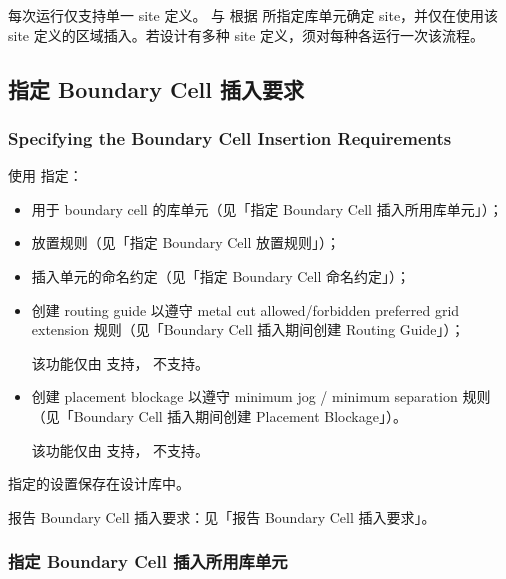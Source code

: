 每次运行仅支持单一 site 定义。 与  根据  所指定库单元确定 site，并仅在使用该 site 定义的区域插入。若设计有多种 site 定义，须对每种各运行一次该流程。

\subsection{指定 Boundary Cell 插入要求}
\subsubsection*{Specifying the Boundary Cell Insertion Requirements}

使用  指定：
\begin{itemize}
  \item 用于 boundary cell 的库单元（见「指定 Boundary Cell 插入所用库单元」）；
  \item 放置规则（见「指定 Boundary Cell 放置规则」）；
  \item 插入单元的命名约定（见「指定 Boundary Cell 命名约定」）；
  \item 创建 routing guide 以遵守 metal cut allowed/forbidden preferred grid extension 规则（见「Boundary Cell 插入期间创建 Routing Guide」）；
\begin{noteBox}
该功能仅由  支持， 不支持。
\end{noteBox}
  \item 创建 placement blockage 以遵守 minimum jog / minimum separation 规则（见「Boundary Cell 插入期间创建 Placement Blockage」）。
\begin{noteBox}
该功能仅由  支持， 不支持。
\end{noteBox}
\end{itemize}

\begin{noteBox}
 指定的设置保存在设计库中。
\end{noteBox}

\begin{seeAlsoBox}
报告 Boundary Cell 插入要求：见「报告 Boundary Cell 插入要求」。
\end{seeAlsoBox}

\subsubsection{指定 Boundary Cell 插入所用库单元}
